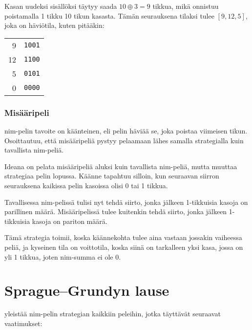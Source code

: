 Kasan uudeksi sisällöksi täytyy saada
$10 \oplus 3 = 9$ tikkua,
mikä onnistuu poistamalla 1 tikku
10 tikun kasasta.
Tämän seurauksena tilaksi tulee $[9,12,5]$,
joka on häviötila, kuten pitääkin:

\begin{center}
\begin{tabular}{r|r}
9 & \texttt{1001} \\
12 & \texttt{1100} \\
5 & \texttt{0101} \\
\hline
0 & \texttt{0000} \\
\end{tabular}
\end{center}

\subsubsection{Misääripeli}


 nim-pelin tavoite on käänteinen,
eli pelin häviää se, joka poistaa viimeisen tikun.
Osoittautuu, että misääripeliä pystyy pelaamaan lähes samalla
strategialla kuin tavallista nim-peliä.

Ideana on pelata misääripeliä aluksi kuin tavallista
nim-peliä, mutta muuttaa strategiaa pelin
lopussa. Käänne tapahtuu silloin, kun seuraavan
siirron seurauksena kaikissa pelin kasoissa olisi 0 tai 1 tikkua.

Tavallisessa nim-pelissä tulisi nyt tehdä siirto,
jonka jälkeen 1-tikkuisia kasoja on parillinen määrä.
Misääripelissä tulee kuitenkin tehdä siirto,
jonka jälkeen 1-tikkuisia kasoja on pariton määrä.

Tämä strategia toimii, koska käännekohta tulee aina
vastaan jossakin vaiheessa peliä,
ja kyseinen tila on voittotila,
koska siinä on tarkalleen yksi kasa,
jossa on yli 1 tikkua,
joten nim-summa ei ole 0.

\section{Sprague–Grundyn lause}


 yleistää nim-pelin strategian
kaikkiin peleihin, jotka täyttävät
seuraavat vaatimukset:


